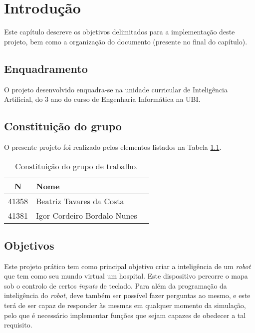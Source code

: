 \chapter{Introdução}
\label{chap:intro}

Este capítulo descreve os objetivos delimitados para a implementação deste projeto, bem como a organização do documento (presente no final do capítulo).

\section{Enquadramento}
\label{sec:amb}

O projeto desenvolvido enquadra-se na unidade curricular de Inteligência Artificial, do 3\textordmasculine{} ano do curso de Engenharia Informática na \ac{UBI}.                                   

\section{Constituição do grupo}
\label{sec::intro:grupo}

O presente projeto foi realizado pelos elementos listados na Tabela \ref{tab::grupo}.

\begin{table}[!h]
	\centering
	\begin{tabular}{c l >{\itshape}l}
		\toprule
		\textbf{N\textordmasculine} & \textbf{Nome}\\
		\midrule
		41358 & Beatriz Tavares da Costa   \\
		41381 & Igor Cordeiro Bordalo Nunes\\
		\bottomrule
	\end{tabular}
	\caption[Constituição da grupo]{Constituição do grupo de trabalho.}
	\label{tab::grupo}
\end{table}

\section{Objetivos}
\label{sec:obj}
Este projeto prático tem como principal objetivo criar a inteligência de um \emph{robot} que tem como seu mundo virtual um hospital. Este dispositivo percorre o mapa sob o controlo de certos \emph{inputs} de teclado. Para além da programação da inteligência do \emph{robot}, deve também ser possível fazer perguntas ao mesmo, e este terá de ser capaz de responder às mesmas em qualquer momento da simulação, pelo que é necessário implementar funções que sejam capazes de obedecer a tal requisito.


